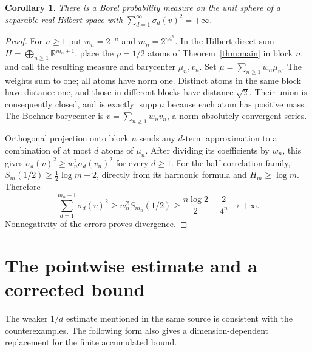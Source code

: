 \documentclass[11pt]{article}
\newtheorem{corollary}[theorem]{Corollary}
\newcommand{\R}{\mathbb R}
\newcommand{\supp}{\operatorname{supp}}
\begin{document}
\begin{corollary}\label{cor:divergent}
There is a Borel probability measure on the unit sphere of a separable real
Hilbert space with $\sum_{d=1}^\infty\sigma_d(v)^2=+\infty$.
\end{corollary}
\begin{proof}
For $n\geq1$ put $w_n=2^{-n}$ and $m_n=2^{n4^n}$.
In the Hilbert direct sum $H=\bigoplus_{n\geq1}\R^{m_n+1}$, place the
$\rho=1/2$ atoms of Theorem~\ref{thm:main} in block $n$, and call the
resulting measure and barycenter $\mu_n,v_n$.
Set $\mu=\sum_{n\geq1}w_n\mu_n$. The weights sum to one;
all atoms have norm one. Distinct atoms in the same block have distance
one, and those in different blocks have distance $\sqrt2$.
Their union is consequently closed, and is exactly $\supp\mu$ because
each atom has positive mass. The Bochner barycenter is
$v=\sum_{n\geq1}w_n v_n$, a norm-absolutely convergent series.

Orthogonal projection onto block $n$ sends any $d$-term approximation
to a combination of at most $d$ atoms of $\mu_n$.
After dividing its coefficients by $w_n$, this gives
$\sigma_d(v)^2\geq w_n^2\sigma_d(v_n)^2$ for every $d\geq1$.
For the half-correlation family,
$S_m(1/2)\geq\tfrac12\log m-2$, directly from its harmonic formula
and $H_m\geq\log m$. Therefore
\[
 \sum_{d=1}^{m_n-1}\sigma_d(v)^2
 \geq w_n^2 S_{m_n}(1/2)
 \geq\frac{n\log2}{2}-\frac2{4^n}\longrightarrow+\infty.
\]
Nonnegativity of the errors proves divergence.
\end{proof}

\section{The pointwise estimate and a corrected bound}
The weaker $1/d$ estimate mentioned in the same source is consistent with
the counterexamples. The following form also gives a dimension-dependent
replacement for the finite accumulated bound.
\end{document}
